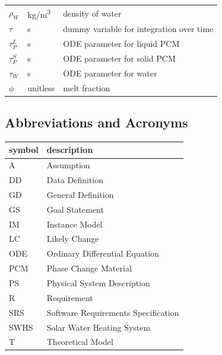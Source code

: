 \documentclass[12pt]{article}
\newcommand{\blt}{- } %
\newcommand{\progname}{SWHS}
\begin{document}
\begin{longtable*}{l l p{12cm}}
  $\rho_W$ & \si[per-mode=symbol] {\kilogram\per\cubic\metre} & density of water
  \\
  $\tau$ & \si[per-mode=symbol] {\second} & dummy variable for integration over time
  \\
  $\tau_P^L$ & \si[per-mode=symbol] {\second} & ODE parameter for liquid PCM
  \\
  $\tau_P^S$ & \si[per-mode=symbol] {\second} & ODE parameter for solid PCM
  \\
  $\tau_W$ & \si[per-mode=symbol] {\second} & ODE parameter for water
  \\
  $\phi$ & \si[per-mode=symbol] {unitless} & melt fraction
  \\
  \bottomrule
\end{longtable*}



\subsection{Abbreviations and Acronyms}

\renewcommand{\arraystretch}{1.2}
\begin{tabular}{l l} 
  \toprule		
  \textbf{symbol} & \textbf{description}\\
  \midrule 
  A & Assumption\\
  DD & Data Definition\\
  GD & General Definition\\
  GS & Goal Statement\\
  IM & Instance Model\\
  LC & Likely Change\\
  ODE & Ordinary Differential Equation\\
  PCM & Phase Change Material\\
  PS & Physical System Description\\
  R & Requirement\\
  SRS & Software Requirements Specification\\
  \progname{} & Solar Water Heating System\\
  T & Theoretical Model\\
  \bottomrule
\end{tabular}\\
\end{document}
